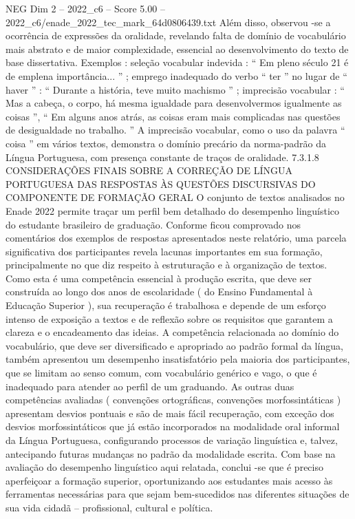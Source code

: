 \begin{textsample}{NEG Dim 2 – 2022\_c6 – Score 5.00 – 2022\_c6/enade\_2022\_tec\_mark\_64d0806439.txt}
Além disso, observou -se a ocorrência de expressões da oralidade, revelando falta de domínio de vocabulário mais abstrato e de maior complexidade, essencial ao desenvolvimento do texto de base dissertativa.
Exemplos : seleção vocabular indevida : “ Em pleno século 21 é de emplena importância... ” ; emprego inadequado do verbo “ ter ” no lugar de “ haver ” : “ Durante a história, teve muito machismo ” ; imprecisão vocabular : “ Mas a cabeça, o corpo, há mesma igualdade para desenvolvermos igualmente as coisas ”, “ Em alguns anos atrás, as coisas eram mais complicadas nas questões de desigualdade no trabalho. ” A imprecisão vocabular, como o uso da palavra “ coisa ” em vários textos, demonstra o domínio precário da norma-padrão da Língua Portuguesa, com presença constante de traços de oralidade. 7.3.1.8 CONSIDERAÇÕES FINAIS SOBRE A CORREÇÃO DE LÍNGUA PORTUGUESA DAS RESPOSTAS ÀS QUESTÕES DISCURSIVAS DO COMPONENTE DE FORMAÇÃO GERAL O conjunto de textos analisados no Enade 2022 permite traçar um perfil bem detalhado do desempenho linguístico do estudante brasileiro de graduação.
Conforme ficou comprovado nos comentários dos exemplos de respostas apresentados neste relatório, uma parcela significativa dos participantes revela lacunas importantes em sua formação, principalmente no que diz respeito à estruturação e à organização de textos.
Como esta é uma competência essencial à produção escrita, que deve ser construída ao longo dos anos de escolaridade ( do Ensino Fundamental à Educação Superior ), sua recuperação é trabalhosa e depende de um esforço intenso de exposição a textos e de reflexão sobre os requisitos que garantem a clareza e o encadeamento das ideias.
A competência relacionada ao domínio do vocabulário, que deve ser diversificado e apropriado ao padrão formal da língua, também apresentou um desempenho insatisfatório pela maioria dos participantes, que se limitam ao senso comum, com vocabulário genérico e vago, o que é inadequado para atender ao perfil de um graduando.
As outras duas competências avaliadas ( convenções ortográficas, convenções morfossintáticas ) apresentam desvios pontuais e são de mais fácil recuperação, com exceção dos desvios morfossintáticos que já estão incorporados na modalidade oral informal da Língua Portuguesa, configurando processos de variação linguística e, talvez, antecipando futuras mudanças no padrão da modalidade escrita.
Com base na avaliação do desempenho linguístico aqui relatada, conclui -se que é preciso aperfeiçoar a formação superior, oportunizando aos estudantes mais acesso às ferramentas necessárias para que sejam bem-sucedidos nas diferentes situações de sua vida cidadã – profissional, cultural e política.

\end{textsample}
